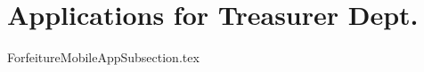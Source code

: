\documentclass[class=book , crop=false]{standalone}
\title{}  %
\begin{document}
\ifstandalone
\maketitle %
\clearpage
\tableofcontents %
\fi

\section{Applications for Treasurer Dept.}

{ForfeitureMobileAppSubsection.tex}
\end{document}
